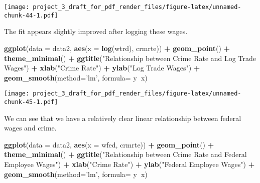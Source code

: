 \documentclass[]{article}
\newenvironment{Shaded}{\begin{snugshade}}{\end{snugshade}}
\newcommand{\DataTypeTok}[1]{\textcolor[rgb]{0.13,0.29,0.53}{#1}}
\newcommand{\KeywordTok}[1]{\textcolor[rgb]{0.13,0.29,0.53}{\textbf{#1}}}
\newcommand{\NormalTok}[1]{#1}
\newcommand{\OperatorTok}[1]{\textcolor[rgb]{0.81,0.36,0.00}{\textbf{#1}}}
\newcommand{\StringTok}[1]{\textcolor[rgb]{0.31,0.60,0.02}{#1}}
\begin{document}
\texttt{[image: project\_3\_draft\_for\_pdf\_render\_files/figure-latex/unnamed-chunk-44-1.pdf]}

The fit appears slightly improved after logging these wages.

\begin{Shaded}
\begin{Highlighting}[]
\KeywordTok{ggplot}\NormalTok{(}\DataTypeTok{data =}\NormalTok{ data2, }\KeywordTok{aes}\NormalTok{(}\DataTypeTok{x =} \KeywordTok{log}\NormalTok{(wtrd), crmrte)) }\OperatorTok{+}
\StringTok{  }\KeywordTok{geom_point}\NormalTok{() }\OperatorTok{+}
\StringTok{  }\KeywordTok{theme_minimal}\NormalTok{() }\OperatorTok{+}
\StringTok{  }\KeywordTok{ggtitle}\NormalTok{(}\StringTok{"Relationship between Crime Rate and Log Trade Wages"}\NormalTok{) }\OperatorTok{+}\StringTok{ }
\StringTok{  }\KeywordTok{xlab}\NormalTok{(}\StringTok{"Crime Rate"}\NormalTok{) }\OperatorTok{+}\StringTok{ }\KeywordTok{ylab}\NormalTok{(}\StringTok{"Log Trade Wages"}\NormalTok{) }\OperatorTok{+}
\StringTok{  }\KeywordTok{geom_smooth}\NormalTok{(}\DataTypeTok{method=}\StringTok{'lm'}\NormalTok{, }\DataTypeTok{formula=}\NormalTok{ y}\OperatorTok{~}\NormalTok{x)}
\end{Highlighting}
\end{Shaded}

\texttt{[image: project\_3\_draft\_for\_pdf\_render\_files/figure-latex/unnamed-chunk-45-1.pdf]}

We can see that we have a relatively clear linear relationship between
federal wages and crime.

\begin{Shaded}
\begin{Highlighting}[]
\KeywordTok{ggplot}\NormalTok{(}\DataTypeTok{data =}\NormalTok{ data2, }\KeywordTok{aes}\NormalTok{(}\DataTypeTok{x =}\NormalTok{ wfed, crmrte)) }\OperatorTok{+}
\StringTok{  }\KeywordTok{geom_point}\NormalTok{() }\OperatorTok{+}
\StringTok{  }\KeywordTok{theme_minimal}\NormalTok{() }\OperatorTok{+}
\StringTok{  }\KeywordTok{ggtitle}\NormalTok{(}\StringTok{"Relationship between Crime Rate and Federal Employee Wages"}\NormalTok{) }\OperatorTok{+}\StringTok{ }
\StringTok{  }\KeywordTok{xlab}\NormalTok{(}\StringTok{"Crime Rate"}\NormalTok{) }\OperatorTok{+}\StringTok{ }\KeywordTok{ylab}\NormalTok{(}\StringTok{"Federal Employee Wages"}\NormalTok{) }\OperatorTok{+}
\StringTok{  }\KeywordTok{geom_smooth}\NormalTok{(}\DataTypeTok{method=}\StringTok{'lm'}\NormalTok{, }\DataTypeTok{formula=}\NormalTok{ y}\OperatorTok{~}\NormalTok{x)}
\end{Highlighting}
\end{Shaded}
\end{document}
